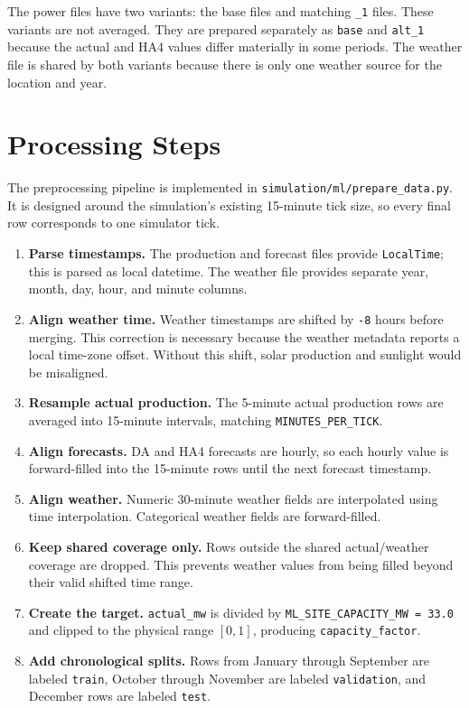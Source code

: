 \documentclass[paper=a4, fontsize=11pt]{scrartcl}
\numberwithin{table}{section}
\begin{document}
The power files have two variants: the base files and matching \texttt{\_1}
files. These variants are not averaged. They are prepared separately as
\texttt{base} and \texttt{alt\_1} because the actual and HA4 values differ
materially in some periods. The weather file is shared by both variants because
there is only one weather source for the location and year.

\section{Processing Steps}

The preprocessing pipeline is implemented in \texttt{simulation/ml/prepare\_data.py}.
It is designed around the simulation's existing 15-minute tick size, so every
final row corresponds to one simulator tick.

\begin{enumerate}
    \item \textbf{Parse timestamps.} The production and forecast files provide
    \texttt{LocalTime}; this is parsed as local datetime. The weather file
    provides separate year, month, day, hour, and minute columns.

    \item \textbf{Align weather time.} Weather timestamps are shifted by
    \texttt{-8} hours before merging. This correction is necessary because the
    weather metadata reports a local time-zone offset. Without this shift, solar
    production and sunlight would be misaligned.

    \item \textbf{Resample actual production.} The 5-minute actual production
    rows are averaged into 15-minute intervals, matching
    \texttt{MINUTES\_PER\_TICK}.

    \item \textbf{Align forecasts.} DA and HA4 forecasts are hourly, so each
    hourly value is forward-filled into the 15-minute rows until the next
    forecast timestamp.

    \item \textbf{Align weather.} Numeric 30-minute weather fields are
    interpolated using time interpolation. Categorical weather fields are
    forward-filled.

    \item \textbf{Keep shared coverage only.} Rows outside the shared
    actual/weather coverage are dropped. This prevents weather values from
    being filled beyond their valid shifted time range.

    \item \textbf{Create the target.} \texttt{actual\_mw} is divided by
    \texttt{ML\_SITE\_CAPACITY\_MW = 33.0} and clipped to the physical range
    \([0,1]\), producing \texttt{capacity\_factor}.

    \item \textbf{Add chronological splits.} Rows from January through September
    are labeled \texttt{train}, October through November are labeled
    \texttt{validation}, and December rows are labeled \texttt{test}.
\end{enumerate}
\end{document}
